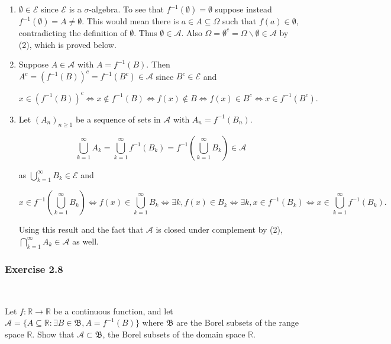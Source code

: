 \documentclass{article}
\begin{document}
\begin{enumerate}

\item $\emptyset \in \mathcal{E}$ since $\mathcal{E}$ is a $\sigma$-algebra. To see that $f^{-1}(\emptyset) = \emptyset$ suppose instead $f^{-1}(\emptyset) = A \neq \emptyset$. This would mean there is $a \in A\subseteq \Omega$ such that $f(a) \in \emptyset$, contradicting the definition of $\emptyset$. Thus $\emptyset \in \mathcal{A}$. Also $\Omega = \emptyset^c = \Omega \backslash \emptyset \in \mathcal{A}$ by (2), which is proved below. 

\item Suppose $A \in \mathcal{A}$ with $A = f^{-1}(B)$. Then $A^c = (f^{-1}(B))^c = f^{-1}(B^c) \in \mathcal{A}$ since $B^c \in \mathcal{E}$ and 

$$
x \in (f^{-1}(B))^c \iff x \notin f^{-1}(B) \iff f(x) \notin B \iff f(x) \in B^c \iff x \in f^{-1}(B^c).
$$


\item Let $(A_n)_{n\geq 1}$ be a sequence of sets in $\mathcal{A}$ with $A_n = f^{-1}(B_n)$.

$$\bigcup_{k=1}^\infty A_k = \bigcup_{k=1}^\infty f^{-1}(B_k) = f^{-1}\left(\bigcup_{k=1}^\infty  B_k \right) \in \mathcal{A}
$$

as $\bigcup_{k=1}^\infty B_k \in \mathcal{E}$ and 

$$x \in f^{-1}\left(\bigcup_{k=1}^\infty  B_k \right)
\iff f(x) \in \bigcup_{k=1}^\infty  B_k
\iff \exists k, f(x) \in B_k
\iff \exists k, x \in f^{-1}(B_k)
\iff x \in \bigcup_{k=1}^\infty  f^{-1}(B_k).
$$

Using this result and the fact that $\mathcal{A}$ is closed under complement by (2), $\bigcap_{k=1}^\infty A_k \in \mathcal{A}$ as well. 
\end{enumerate}

\subsubsection*{Exercise 2.8}\

Let $f: \mathbb{R} \rightarrow \mathbb{R}$ be a continuous function, and let $\mathcal{A} = \{A \subseteq \mathbb{R} : \exists B \in \mathfrak{B}, A = f^{-1}(B)\}$ where $\mathfrak{B}$ are the Borel subsets of the range space $\mathbb{R}$. Show that $\mathcal{A}\subset \mathfrak{B}$, the Borel subsets of the domain space $\mathbb{R}$. \\
\end{document}

